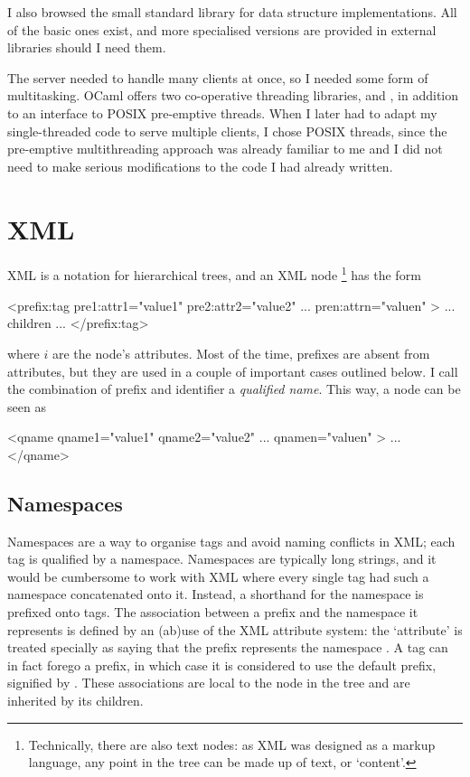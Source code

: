 \documentclass[12pt,a4paper,twoside,openright]{report}
\begin{document}
{I also browsed the small standard library for data structure implementations. All of the basic ones exist, and more specialised versions are provided in external libraries should I need them.

The server needed to handle many clients at once, so I needed some form of multitasking. OCaml offers two co-operative threading libraries,  and , in addition to an interface to POSIX pre-emptive threads. When I later had to adapt my single-threaded code to serve multiple clients, I chose POSIX threads, since the pre-emptive multithreading approach was already familiar to me and I did not need to make serious modifications to the code I had already written.

\section{XML}
XML is a notation for hierarchical trees, and an XML node \footnote{Technically, there are also text nodes: as XML was designed as a markup language, any point in the tree can be made up of text, or `content'.} has the form
\begin{xml}
<prefix:tag pre1:attr1="value1" pre2:attr2="value2" ... pren:attrn="valuen" >
   ... children ...
</prefix:tag>
\end{xml}
where \(i\) are the node's attributes. Most of the time, prefixes are absent from attributes, but they are used in a couple of important cases outlined below. I call the combination of prefix and identifier a \emph{qualified name}. This way, a node can be seen as
\begin{xml}
<qname qname1="value1" qname2="value2" ... qnamen="valuen" >
  ...
</qname>
\end{xml}

\subsection{Namespaces}\label{sec:namespaces}
Namespaces are a way to organise tags and avoid naming conflicts in XML; each tag is qualified by a namespace. Namespaces are typically long strings, and it would be cumbersome to work with XML where every single tag had such a namespace concatenated onto it. Instead, a shorthand for the namespace is prefixed onto tags. The association between a prefix and the namespace it represents is defined by an (ab)use of the XML attribute system: the `attribute'  is treated specially as saying that the prefix  represents the namespace . A tag can in fact forego a prefix, in which case it is considered to use the default prefix, signified by . These associations are local to the node in the tree and are inherited by its children.

}
\end{document}
